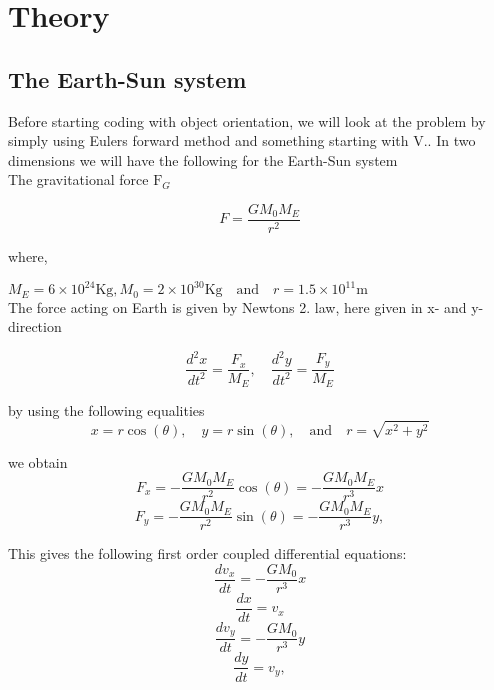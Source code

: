 \documentclass[../main.tex]{subfiles}
\begin{document}
\section{Theory}\label{theory}
\subsection{The Earth-Sun system}
Before starting coding with object orientation, we will look at the problem by simply using Eulers forward method and something starting with V..
In two dimensions we will have the following for the Earth-Sun system \\

The gravitational force  $\text{F}_G$

\begin{equation}
  F = \frac{GM_0M_E}{r^2}
\end{equation}

where,

$M_E = 6\times 10^{24}\text{Kg},  M_0 = 2\times 10^{30}\text{Kg} \quad \text{and}\quad  r = 1.5\times 10^{11}\text{m}$\\

The force acting on Earth is given by Newtons 2. law, here given in x- and y- direction

$$ \frac{d^2x}{dt^2} = \frac{F_x}{M_E}, \quad \frac{d^2y}{dt^2} = \frac{F_y}{M_E}$$

by using the following equalities $$x = r \cos(\theta),\quad  y = r\sin(\theta), \quad \text{and}\quad r = \sqrt{x^2 +y^2}$$

we obtain\\

\begin{equation}
  F_x = - \frac{GM_0M_E}{r^2} \cos(\theta) =- \frac{GM_0M_E}{r^3}x
\end{equation}
\begin{equation}
  F_y = - \frac{GM_0M_E}{r^2}\sin(\theta) =- \frac{GM_0M_E}{r^3}y,
\end{equation}

This gives the following first order  coupled differential equations:
\begin{equation}
  \frac{dv_x}{dt} = - \frac{GM_0}{r^3}x
\end{equation}
\begin{equation}
  \frac{dx}{dt} = v_x
\end{equation}
\begin{equation}
  \frac{dv_y}{dt} = - \frac{GM_0}{r^3}y
\end{equation}
\begin{equation}
  \frac{dy}{dt} = v_y,
\end{equation}
\end{document}
